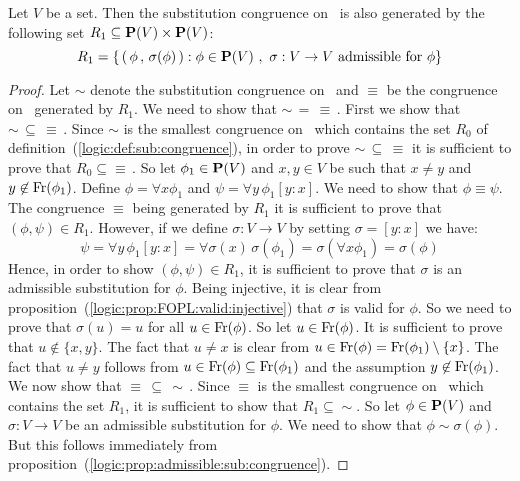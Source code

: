 \begin{prop}\label{logic:prop:sub:congruence:from:admissible}
Let $V$ be a set. Then the substitution congruence on \pv\ is also
generated by the following set $R_{1}\subseteq \mbox{${\bf P}(V)$}\times\mbox{${\bf P}(V)$}$:
    \[
    R_{1}=\left\{\,(\,\phi\,,\,\sigma(\phi)\,):\phi\in\pv\ ,\
    \mbox{$\sigma:V\to V$ admissible for $\phi$} \right\}
    \]
\end{prop}
\begin{proof}
Let $\sim$ denote the substitution congruence on \pv\ and $\equiv$
be the congruence on \pv\ generated by $R_{1}$. We need to show that
$\sim\,=\,\equiv\,$. First we show that $\sim\,\subseteq\,\equiv\,$.
Since $\sim$ is the smallest congruence on \pv\ which contains the
set $R_{0}$ of definition~(\ref{logic:def:sub:congruence}), in order
to prove $\sim\,\subseteq\,\equiv$ it is sufficient to prove that
$R_{0}\subseteq\equiv\,$. So let $\phi_{1}\in\mbox{${\bf P}(V)$}$ and $x,y\in V$ be
such that $x\neq y$ and $y\not\in\mbox{\rm Fr}(\phi_{1})$. Define
$\phi=\forall x\phi_{1}$ and $\psi=\forall y\,\phi_{1}[y\!:\!x]$. We
need to show that $\phi\equiv\psi$. The congruence $\equiv$ being
generated by $R_{1}$ it is sufficient to prove that $(\phi,\psi)\in
R_{1}$. However, if we define $\sigma:V\to V$ by setting
$\sigma=[y\!:\!x]$ we have:
    \[
    \psi=\forall
    y\,\phi_{1}[y\!:\!x]=\forall\sigma(x)\,\sigma(\phi_{1})=\sigma(\forall
    x\phi_{1})=\sigma(\phi)
    \]
Hence, in order to show $(\phi,\psi)\in R_{1}$, it is sufficient to
prove that $\sigma$ is an admissible substitution for $\phi$. Being
injective, it is clear from
proposition~(\ref{logic:prop:FOPL:valid:injective}) that $\sigma$ is
valid for $\phi$. So we need to prove that $\sigma(u)=u$ for all
$u\in\mbox{\rm Fr}(\phi)$. So let $u\in\mbox{\rm Fr}(\phi)$. It is sufficient to
prove that $u\not\in\{x,y\}$. The fact that $u\neq x$ is clear from
$u\in\mbox{\rm Fr}(\phi)=\mbox{\rm Fr}(\phi_{1})\setminus\{x\}$. The fact that
$u\neq y$ follows from $u\in\mbox{\rm Fr}(\phi)\subseteq\mbox{\rm Fr}(\phi_{1})$ and
the assumption $y\not\in\mbox{\rm Fr}(\phi_{1})$. We now show that
$\equiv\,\subseteq\,\sim\,$. Since $\equiv$ is the smallest
congruence on \pv\ which contains the set $R_{1}$, it is sufficient
to show that $R_{1}\subseteq\sim$. So let $\phi\in\mbox{${\bf P}(V)$}$ and
$\sigma:V\to V$ be an admissible substitution for $\phi$. We need to
show that $\phi\sim\sigma(\phi)$. But this follows immediately from
proposition~(\ref{logic:prop:admissible:sub:congruence}).
\end{proof}
